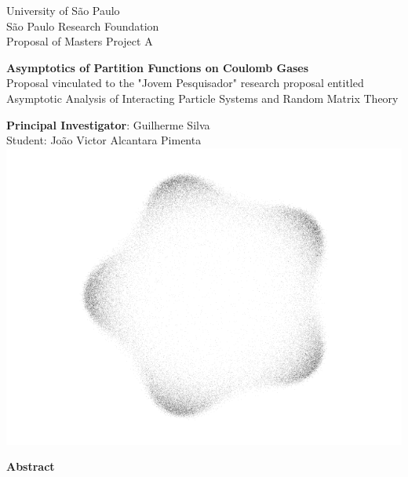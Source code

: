 \documentclass[12pt,a4paper]{article}
\numberwithin{equation}{section} %
\begin{document}
\begin{titlepage}
    \begin{center}
        {\large \sc University of São Paulo} \\
		{\large \sc São Paulo Research Foundation}\\
    	{\large \sc Proposal of Masters Project A}
    	
    	\vspace{1cm}
    	
    	{\Large \bfseries Asymptotics of Partition Functions on Coulomb Gases} \\
    	\vspace{1cm}
    	{\small \sc Proposal vinculated to the "Jovem Pesquisador" research proposal entitled} \\
    	{\small \sc Asymptotic Analysis of Interacting Particle Systems and Random Matrix Theory} \\
    	\vspace{1cm}
    	
    	{\small \sc \textbf{Principal Investigator}: Guilherme Silva}\\
    	{\small \sc Student: João Victor Alcantara Pimenta}\\[0.5cm]
    	
    	\includegraphics[scale=0.35]{Assets/CuteCircleWhite}
    	
    \end{center}

    \vfill

    \begin{center}
        {\bf \large Abstract} \\[1em]
    \end{center}
    
    
\end{titlepage}
\end{document}
